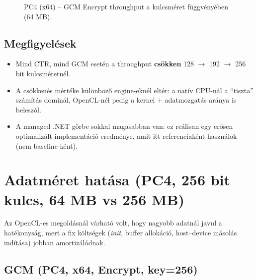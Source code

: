 \begin{figure}[H]
  \centering
  \caption{PC4 (x64) -- GCM Encrypt throughput a kulcsméret függvényében (64 MB).}
\end{figure}

\subsection{Megfigyelések}

\begin{itemize}
  \item Mind CTR, mind GCM esetén a throughput \textbf{csökken} 128 $\rightarrow$ 192 $\rightarrow$ 256 bit kulcsméretnél.
  \item A csökkenés mértéke különböző engine-eknél eltér: a natív CPU-nál a ``tiszta'' számítás dominál,
        OpenCL-nél pedig a kernel + adatmozgatás aránya is beleszól.
  \item A managed .NET görbe sokkal magasabban van: ez reálisan egy erősen optimalizált implementáció eredménye,
        amit itt referenciaként használok (nem baseline-ként).
\end{itemize}

\section{Adatméret hatása (PC4, 256 bit kulcs, 64 MB vs 256 MB)}

Az OpenCL-es megoldásnál várható volt, hogy nagyobb adatnál javul a hatékonyság, mert
a fix költségek (\emph{init}, buffer allokáció, host--device másolás indítása) jobban amortizálódnak.

\subsection{GCM (PC4, x64, Encrypt, key=256)}

